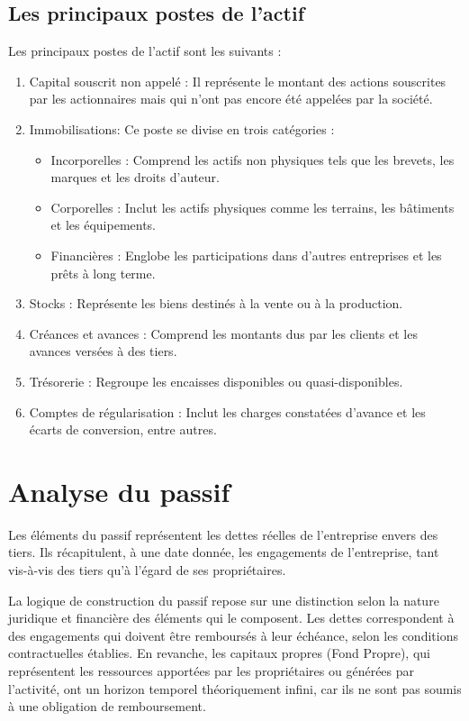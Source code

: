 \documentclass[a4paper, 12pt]{report}
\begin{document}
\subsection{Les principaux postes de l'actif}

Les principaux postes de l'actif sont les suivants :

\begin{enumerate}
	\item Capital souscrit non appelé : Il représente le montant des actions souscrites par les actionnaires mais qui n'ont pas encore été appelées par la société.
	\item Immobilisations: Ce poste se divise en trois catégories :
\begin{itemize}
	\item  Incorporelles : Comprend les actifs non physiques tels que les brevets, les marques et les droits d'auteur.
	\item  Corporelles : Inclut les actifs physiques comme les terrains, les bâtiments et les équipements.	
	\item Financières : Englobe les participations dans d'autres entreprises et les prêts à long terme.
\end{itemize}
	\item Stocks : Représente les biens destinés à la vente ou à la production.
	\item Créances et avances : Comprend les montants dus par les clients et les avances versées à des tiers.
	\item Trésorerie : Regroupe les encaisses disponibles ou quasi-disponibles.
	\item Comptes de régularisation : Inclut les charges constatées d'avance et les écarts de conversion, entre autres.
\end{enumerate}

\section{Analyse du passif}

Les éléments du passif représentent les dettes réelles de l'entreprise envers des tiers. Ils récapitulent, à une date donnée, les engagements de l'entreprise, tant vis-à-vis des tiers qu'à l'égard de ses propriétaires. 

La logique de construction du passif repose sur une distinction selon la nature juridique et financière des éléments qui le composent. Les dettes correspondent à des engagements qui doivent être remboursés à leur échéance, selon les conditions contractuelles établies. En revanche, les capitaux propres (Fond Propre), qui représentent les ressources apportées par les propriétaires ou générées par l'activité, ont un horizon temporel théoriquement infini, car ils ne sont pas soumis à une obligation de remboursement.
\end{document}
